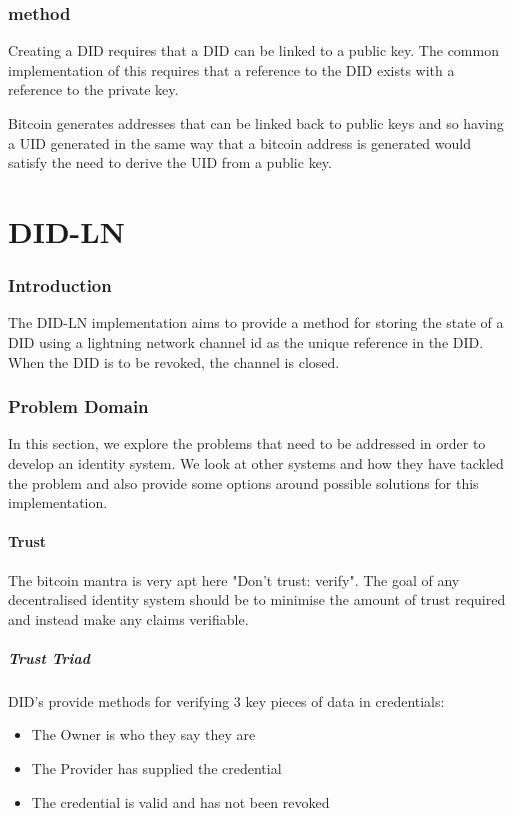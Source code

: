 \documentclass[10pt,a4paper]{runcrypto}
\begin{document}
\section{method}
Creating a DID requires that a DID can be linked to a public key.  The common implementation of this requires that a reference to the DID exists with a reference to the private key.

Bitcoin generates addresses that can be linked back to public keys and so having a UID generated in the same way that a bitcoin address is generated would satisfy the need to derive the UID from a public key.

\part{DID-LN}

\section{Introduction}
The DID-LN implementation aims to provide a method for storing the state of a DID using a lightning network channel id as the unique reference in the DID.  When the DID is to be revoked, the channel is closed.

\section{Problem Domain}
In this section, we explore the problems that need to be addressed in order to develop an identity system.  We look at other systems and how they have tackled the problem and also  provide some options around possible solutions for this implementation.

\subsection{Trust}
The bitcoin mantra is very apt here "Don't trust: verify". The goal of any decentralised identity system should be to minimise the amount of trust required and instead make any claims verifiable.

\subsubsection{Trust Triad}

DID's provide methods for verifying 3 key pieces of data in credentials:

\begin{itemize}
	\item The Owner is who they say they are
	\item The Provider has supplied the credential
    \item The credential is valid and has not been revoked
\end{itemize}
\end{document}
